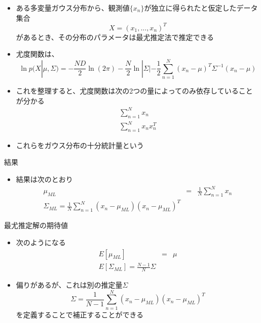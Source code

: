 \begin{frame}
 \begin{itemize}
	\item  ある多変量ガウス分布から、観測値$\{x_n\}$が独立に得られたと仮定したデータ集合
				 \begin{equation}
					X=(x_1,...,x_n)^T
				 \end{equation}
				 があるとき、その分布のパラメータは最尤推定法で推定できる
	\item 尤度関数は、
				\begin{equation}
				 \ln  p(X|\mu, \Sigma) = -\frac{ND}{2}\ln (2\pi)-\frac{N}{2}\ln |\Sigma|-\frac{1}{2}\sum_{n=1}^{N}(x_n-\mu)^T\Sigma^{-1}(x_n-\mu)
\end{equation}
	\item これを整理すると、尤度関数は次の2つの量によってのみ依存していることが分かる
				\begin{eqnarray}
				 \sum_{n=1}^{N}x_n\\
				 \sum_{n=1}^{N}x_nx_n^T
				\end{eqnarray}
	\item これらをガウス分布の十分統計量という
 \end{itemize}
\end{frame}

\begin{frame}{結果}
 \begin{itemize}
	\item 結果は次のとおり
				\begin{eqnarray}
				\mu_{ML} &=& \frac{1}{N}\sum_{n=1}^{N}x_n\\
				 \Sigma_{ML}=\frac{1}{N}\sum_{n=1}^{N}(x_n-\mu_{ML})(x_n-\mu_{ML})^T
				\end{eqnarray}
 \end{itemize}
\end{frame}

\begin{frame}{最尤推定解の期待値}
\begin{itemize}
 \item 次のようになる
			 \begin{eqnarray}
				E[\mu_{ML}]&=&\mu\\
				E[\Sigma_{ML}]=\frac{N-1}{N}\Sigma
			 \end{eqnarray}
 \item 偏りがあるが、これは別の推定量$\Sigma$
			 \begin{equation}
				\Sigma = \frac{1}{N-1}\sum_{n=1}^{N}(x_n-\mu_{ML})(x_n-\mu_{ML})^T
			 \end{equation}
			 を定義することで補正することができる

\end{itemize}

\end{frame}
